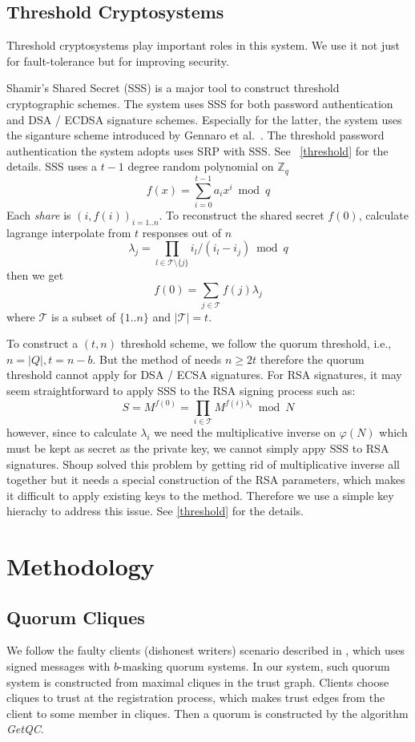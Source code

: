 \documentclass[twoside,twocolumn,10pt,fleqn]{article}
\begin{document}
\subsection{Threshold Cryptosystems}
Threshold cryptosystems play important roles in this system. We use it
not just for fault-tolerance but for improving security.

Shamir's Shared Secret (SSS) is a major tool to construct threshold
cryptographic schemes. The system uses SSS for both password
authentication and DSA / ECDSA signature schemes. Especially for the
latter, the system uses the siganture scheme introduced by Gennaro et
al.\ \cite{Gennaro}. The threshold password authentication the system
adopts uses SRP \cite{srp} with SSS. See ~\ref{threshold} for the
details.
SSS uses a $t-1$ degree random polynomial on $\mathbb{Z}_q$
\[
  f(x) = \sum_{i=0}^{t-1}a_ix^i \bmod q
\]
Each {\em share} is $(i, f(i))_{i = 1..n}$. To reconstruct the shared
secret $f(0)$, calculate lagrange interpolate from $t$ responses out
of $n$
\[
    \lambda_j = \prod_{l \in \mathcal{T} \setminus \{j\}}
    i_l / (i_l - i_j) \bmod q
\]
then we get
\[
  f(0) = \sum_{j \in \mathcal{T}} f(j)\lambda_j
\]
where $\mathcal{T}$ is a subset of $\{1..n\}$ and $|\mathcal{T}| =
t$.

To construct a $(t, n)$ threshold scheme, we follow the quorum
threshold, i.e., $n = |Q|, t = n-b$. But the method of \cite{Gennaro}
needs $n \geq 2t$ therefore the quorum threshold cannot apply for DSA
/ ECSA signatures. 
For RSA signatures, it may seem straightforward to apply SSS to the
RSA signing process such as:
\[ S = M^{f(0)} = \prod_{i \in \mathcal{T}} M^{f(i)\lambda_i} \bmod N \]
however, since to calculate $\lambda_i$ we need the multiplicative
inverse on $\varphi(N)$ which must be kept as secret as the private
key, we cannot simply appy SSS to RSA signatures. Shoup \cite{shoup}
solved this problem by getting rid of multiplicative inverse all
together but it needs a special construction of the RSA parameters,
which makes it difficult to apply existing keys to the
method. Therefore we use a simple key hierachy to address this
issue. See \ref{threshold} for the details.

\section{Methodology}
\subsection{Quorum Cliques}
We follow the faulty clients (dishonest writers) scenario described in
\cite{Delhi:1,Delhi:2}, which uses signed messages with
$b$-masking quorum systems. In our system, such quorum system is
constructed from maximal cliques in the trust graph. 
Clients choose cliques to trust at the registration process, which
makes trust edges from the client to some member in cliques. Then a
quorum is constructed by the algorithm {\em GetQC}.
\end{document}

